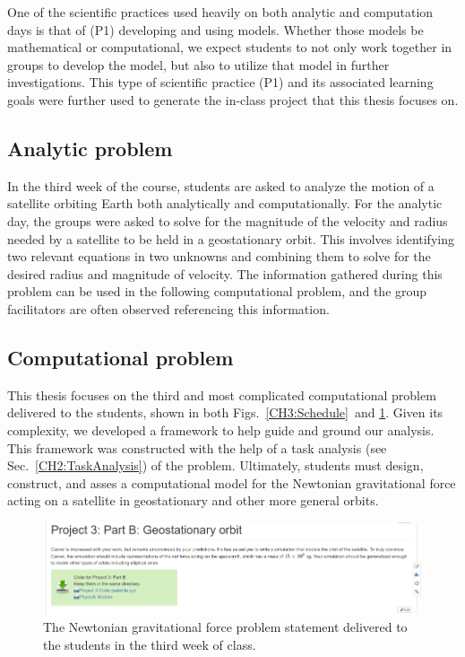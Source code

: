 \documentclass{msuphddissertation}
\begin{document}
\begin{doublespace}
One of the scientific practices used heavily on both analytic and computation days is that of (P1) developing and using models.  Whether those models be mathematical or computational, we expect students to not only work together in groups to develop the model, but also to utilize that model in further investigations.  This type of scientific practice (P1) and its associated learning goals \cite{Irving2017} were further used to generate the in-class project that this thesis focuses on.

\subsection{Analytic problem}

In the third week of the course, students are asked to analyze the motion of a satellite orbiting Earth both analytically and computationally.  For the analytic day, the groups were asked to solve for the magnitude of the velocity and radius needed by a satellite to be held in a geostationary orbit.  This involves identifying two relevant equations in two unknowns and combining them to solve for the desired radius and magnitude of velocity.  The information gathered during this problem can be used in the following computational problem, and the group facilitators are often observed referencing this information.

\subsection{Computational problem}

This thesis focuses on the third and most complicated computational problem delivered to the students, shown in both Figs.~\ref{CH3:Schedule}\ and \ref{CH3:SatelliteProblem}. Given its complexity, we developed a framework to help guide and ground our analysis.  This framework was constructed with the help of a task analysis (see Sec.~\ref{CH2:TaskAnalysis}) of the problem.  Ultimately, students must design, construct, and asses a computational model for the Newtonian gravitational force acting on a satellite in geostationary and other more general orbits.

\begin{figure}[ht]\centering
\includegraphics[scale=1]{images/CH3SatelliteProblem.pdf}
\caption{The Newtonian gravitational force problem statement delivered to the students in the third week of class.}\label{CH3:SatelliteProblem}
\end{figure}


\end{doublespace}
\end{document}
